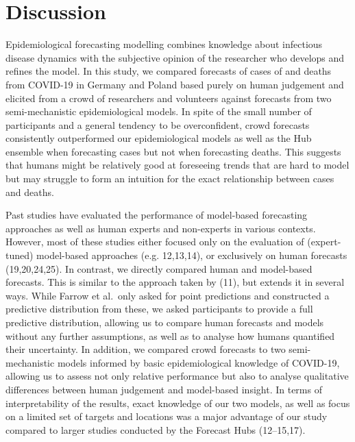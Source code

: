 \documentclass[
]{article}
\begin{document}
\hypertarget{discussion}{%
\section{Discussion}\label{discussion}}

Epidemiological forecasting modelling combines knowledge about infectious disease dynamics with the subjective opinion of the researcher who develops and refines the model. In this study, we compared forecasts of cases of and deaths from COVID-19 in Germany and Poland based purely on human judgement and elicited from a crowd of researchers and volunteers against forecasts from two semi-mechanistic epidemiological models. In spite of the small number of participants and a general tendency to be overconfident, crowd forecasts consistently outperformed our epidemiological models as well as the Hub ensemble when forecasting cases but not when forecasting deaths. This suggests that humans might be relatively good at foreseeing trends that are hard to model but may struggle to form an intuition for the exact relationship between cases and deaths.

Past studies have evaluated the performance of model-based forecasting approaches as well as human experts and non-experts in various contexts. However, most of these studies either focused only on the evaluation of (expert-tuned) model-based approaches (e.g. 12,13,14), or exclusively on human forecasts (19,20,24,25). In contrast, we directly compared human and model-based forecasts. This is similar to the approach taken by (11), but extends it in several ways. While Farrow et al.~only asked for point predictions and constructed a predictive distribution from these, we asked participants to provide a full predictive distribution, allowing us to compare human forecasts and models without any further assumptions, as well as to analyse how humans quantified their uncertainty. In addition, we compared crowd forecasts to two semi-mechanistic models informed by basic epidemiological knowledge of COVID-19, allowing us to assess not only relative performance but also to analyse qualitative differences between human judgement and model-based insight. In terms of interpretability of the results, exact knowledge of our two models, as well as focus on a limited set of targets and locations was a major advantage of our study compared to larger studies conducted by the Forecast Hubs (12--15,17).
\end{document}
